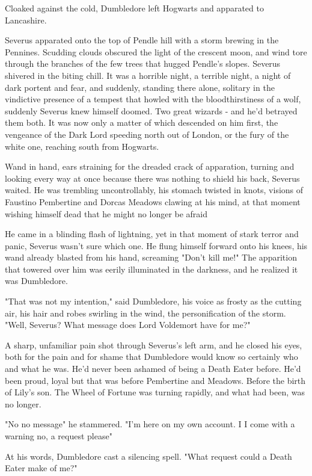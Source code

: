 Cloaked against the cold, Dumbledore left Hogwarts and apparated to Lancashire.

Severus apparated onto the top of Pendle hill with a storm brewing in the Pennines. Scudding clouds obscured the light of the crescent moon, and wind tore through the branches of the few trees that hugged Pendle's slopes. Severus shivered in the biting chill. It was a horrible night, a terrible night, a night of dark portent and fear, and suddenly, standing there alone, solitary in the vindictive presence of a tempest that howled with the bloodthirstiness of a wolf, suddenly Severus knew himself doomed. Two great wizards - and he'd betrayed them both. It was now only a matter of which descended on him first, the vengeance of the Dark Lord speeding north out of London, or the fury of the white one, reaching south from Hogwarts.

Wand in hand, ears straining for the dreaded crack of apparation, turning and looking every way at once because there was nothing to shield his back, Severus waited. He was trembling uncontrollably, his stomach twisted in knots, visions of Faustino Pembertine and Dorcas Meadows clawing at his mind, at that moment wishing himself dead that he might no longer be afraid{\el}

He came in a blinding flash of lightning, yet in that moment of stark terror and panic, Severus wasn't sure which one. He flung himself forward onto his knees, his wand already blasted from his hand, screaming "Don't kill me!" The apparition that towered over him was eerily illuminated in the darkness, and he realized it was Dumbledore.

"That was not my intention," said Dumbledore, his voice as frosty as the cutting air, his hair and robes swirling in the wind, the personification of the storm. "Well, Severus? What message does Lord Voldemort have for me?"

A sharp, unfamiliar pain shot through Severus's left arm, and he closed his eyes, both for the pain and for shame that Dumbledore would know so certainly who and what he was. He'd never been ashamed of being a Death Eater before. He'd been proud, loyal{\el} but that was before Pembertine and Meadows. Before the birth of Lily's son. The Wheel of Fortune was turning rapidly, and what had been, was no longer.

"No{\el} no message{\el}" he stammered. "I'm here on my own account. I{\el} I come with a warning{\el} no, a request{\el} please{\el}"

At his words, Dumbledore cast a silencing spell. "What request could a Death Eater make of me?"

